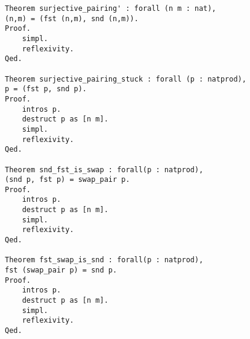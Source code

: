 \begin{lstlisting}[language=coq,firstnumber=1,caption=Coq Beweise für Paar Funktionen,label=lst:practical-proof]
Theorem surjective_pairing' : forall (n m : nat),
(n,m) = (fst (n,m), snd (n,m)).
Proof.
	simpl.
	reflexivity. 
Qed.

Theorem surjective_pairing_stuck : forall (p : natprod),
p = (fst p, snd p).
Proof.
	intros p.
	destruct p as [n m].  
	simpl.
	reflexivity.
Qed.

Theorem snd_fst_is_swap : forall(p : natprod),
(snd p, fst p) = swap_pair p.
Proof.
	intros p.
	destruct p as [n m].
	simpl.
	reflexivity.
Qed.

Theorem fst_swap_is_snd : forall(p : natprod),
fst (swap_pair p) = snd p.
Proof.
	intros p.
	destruct p as [n m].
	simpl.
	reflexivity.
Qed.
\end{lstlisting}

